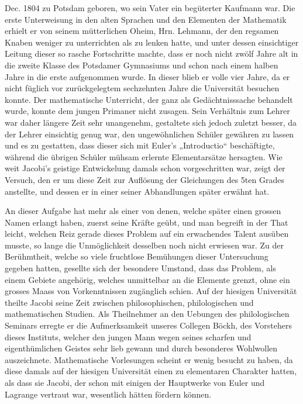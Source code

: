 \documentclass[11pt]{article}
\begin{document}
Dec. 1804 zu Potsdam geboren, wo sein Vater ein begüterter Kaufmann war. Die erste Unterweisung in den alten Sprachen und den Elementen der Mathematik erhielt er von seinem mütterlichen Oheim, Hrn. Lehmann, der den regsamen Knaben weniger zu unterrichten als zu lenken hatte, und unter dessen einsichtiger Leitung dieser so rasche Fortschritte machte, dass er noch nicht zwölf Jahre alt in die zweite Klasse des Potsdamer Gymnasiums und schon nach einem halben Jahre in die erste aufgenommen wurde. In dieser blieb er volle vier Jahre, da er nicht füglich vor zurückgelegtem sechzehnten Jahre die Universität besuchen konnte. Der mathematische Unterricht, der ganz als Gedächtnisssache behandelt wurde, konnte dem jungen Primaner nicht zusagen. Sein Verhältnis zum Lehrer war daher längere Zeit sehr unangenehm, gestaltete sich jedoch zuletzt besser, da der Lehrer einsichtig genug war, den ungewöhnlichen Schüler gewähren zu lassen und es zu gestatten, dass dieser sich mit Euler’s „Introductio“ beschäftigte, während die übrigen Schüler mühsam erlernte Elementarsätze hersagten. Wie weit Jacobi’s geistige Entwickelung damals schon vorgeschritten war, zeigt der Versuch, den er um diese Zeit zur Auflösung der Gleichungen des 5ten Grades anstellte, und dessen er in einer seiner Abhandlungen später erwähnt hat.

An dieser Aufgabe hat mehr als einer von denen, welche später einen grossen Namen erlangt haben, zuerst seine Kräfte geübt, und man begreift in der That leicht, welchen Reiz gerade dieses Problem auf ein erwachendes Talent ausüben musste, so lange die Unmöglichkeit desselben noch nicht erwiesen war. Zu der Berühmtheit, welche so viele fruchtlose Bemühungen dieser Untersuchung gegeben hatten, gesellte sich der besondere Umstand, dass das Problem, als einem Gebiete angehörig, welches unmittelbar an die Elemente grenzt, ohne ein grosses Maass von Vorkenntnissen zugänglich schien. Auf der hiesigen Universität theilte Jacobi seine Zeit zwischen philosophischen, philologischen und mathematischen Studien. Als Theilnehmer an den Uebungen des philologischen Seminars erregte er die Aufmerksamkeit unseres Collegen Böckh, des Vorstehers dieses Instituts, welcher den jungen Mann wegen seines scharfen und eigenthümlichen Geistes sehr lieb gewann und durch besonderes Wohlwollen auszeichnete. Mathematische Vorlesungen scheint er wenig besucht zu haben, da diese damals auf der hiesigen Universität einen zu elementaren Charakter hatten, als dass sie Jacobi, der schon mit einigen der Hauptwerke von Euler und Lagrange vertraut war, wesentlich hätten fördern können.
\end{document}
